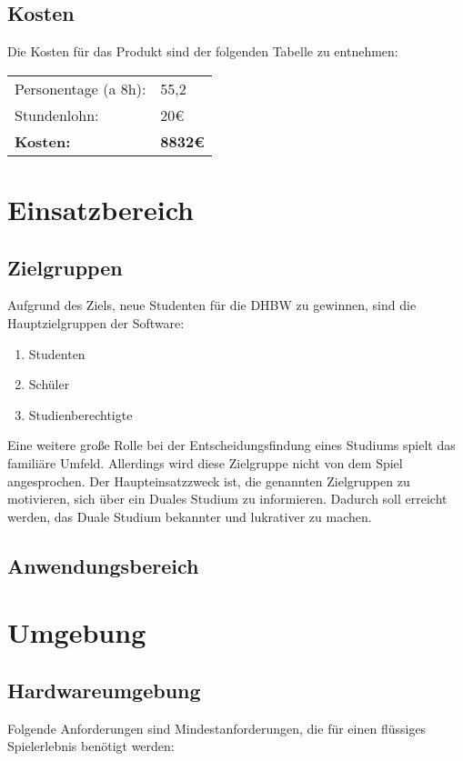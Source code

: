 \section{Kosten}
Die Kosten für das Produkt sind der folgenden Tabelle zu entnehmen:
\begin{table}[H]
\begin{tabularx}{\textwidth}{|l|l|}
\toprule
Personentage (a 8h): & 55,2 \\
Stundenlohn: & 20\euro \\ \hline
\textbf{Kosten:} & \textbf{8832\euro} \\

\hline
\end{tabularx}
\end{table}


\chapter{Einsatzbereich}
\section{Zielgruppen}
Aufgrund des Ziels, neue Studenten für die DHBW zu gewinnen, sind die Hauptzielgruppen der Software:
\begin{enumerate}
    \item Studenten
    \item Schüler
    \item Studienberechtigte
\end{enumerate}

Eine weitere große Rolle bei der Entscheidungsfindung eines Studiums spielt das familiäre Umfeld.
Allerdings wird diese Zielgruppe nicht von dem Spiel angesprochen.
Der Haupteinsatzzweck ist, die genannten Zielgruppen zu motivieren, sich über ein Duales Studium zu informieren.
Dadurch soll erreicht werden, das Duale Studium bekannter und lukrativer zu machen.

\section{Anwendungsbereich}


\chapter{Umgebung}
\section{Hardwareumgebung}
Folgende Anforderungen sind Mindestanforderungen, die für einen flüssiges Spielerlebnis benötigt werden:

